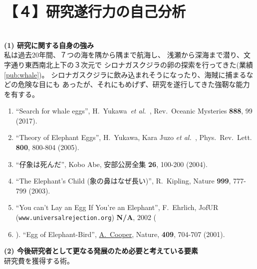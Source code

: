 \documentclass[11pt,a4j,dvipdfmx]{jarticle} 					%
\newcommand{\研究課題名}{象の卵}
\newcommand{\研究機関名}{逢坂大学}
\newcommand{\研究代表者氏名}{湯川秀樹}
\newcommand{\paper}[6]{%
	\item ``#1'', #2, #3 {\bf #4}, #5 (#6).			%
}
\newcommand{\etal}{\textit{et al.\ }}
\newcommand{\yukawa}{H.~Yukawa}					%
\newcommand{\prl}{Phys.\ Rev.\ Lett.\ }		%
\begin{document}
        \nolinenumbers




\section{【４】研究遂行力の自己分析}

\SelfReviewInstructions\\%
\noindent
\textbf{(1) 研究に関する自身の強み}\\
	私は過去20年間、７つの海を隅から隅まで航海し、
	浅瀬から深海まで潜り、文字通り東西南北上下の３次元で
	シロナガスクジラの卵の探索を行ってきた(業績\ref{pub:whale})。		%
	シロナガスクジラに飲み込まれそうになったり、海賊に捕まるなどの危険な目にも
	あったが、それにもめげず、研究を遂行してきた強靭な能力を有する。
	\begin{enumerate}
		\paper{Search for whale eggs}{\yukawa\ \etal}{Rev.\ Oceanic Mysteries}{888}{99}{2017}
			\label{pub:whale}
				
		\paper{Theory of Elephant Eggs}{\yukawa, Kara Juzo \etal}{\prl}{800}{800-804}{2005}
			\label{pub:theoegg}
				
		\paper{仔象は死んだ}{Kobo Abe}{安部公房全集}{26}{100-200}{2004}
		
		\paper{The Elephant's Child (象の鼻はなぜ長い)}{R.~Kipling}{Nature}{999}{777-799}{2003}

		\paper{You can't Lay an Egg If You're an Elephant}{F.~Ehrlich}
			{JofUR\\({\tt www.universalrejection.org})}{{\bf N/A}}{2002}
		
		\item ``Egg of Elephant-Bird'', 
				\underline{A.~Cooper},
				Nature, {\bf 409}, 704-707 (2001).	%
	\end{enumerate}

\vspace{5mm}
\noindent
\textbf{(2) 今後研究者として更なる発展のため必要と考えている要素}\\
研究費を獲得する術。



\end{document}
